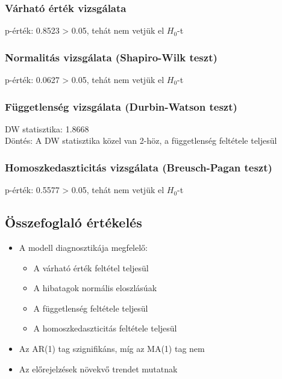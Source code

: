 \documentclass[11pt]{article}
\providecommand{\tightlist}{%
      \setlength{\itemsep}{0pt}\setlength{\parskip}{0pt}}
\begin{document}
\subsubsection{Várható érték
vizsgálata}\label{vuxe1rhatuxf3-uxe9rtuxe9k-vizsguxe1lata}

p-érték: 0.8523 \textgreater{} 0.05, tehát nem vetjük el $H_0$-t

\subsubsection{Normalitás vizsgálata (Shapiro-Wilk
teszt)}\label{normalituxe1s-vizsguxe1lata-shapiro-wilk-teszt}

p-érték: 0.0627 \textgreater{} 0.05, tehát nem vetjük el $H_0$-t

\subsubsection{Függetlenség vizsgálata (Durbin-Watson
teszt)}\label{fuxfcggetlensuxe9g-vizsguxe1lata-durbin-watson-teszt}

DW statisztika: 1.8668\\
Döntés: A DW statisztika közel van 2-höz, a függetlenség feltétele
teljesül

\subsubsection{Homoszkedaszticitás vizsgálata (Breusch-Pagan
teszt)}\label{homoszkedaszticituxe1s-vizsguxe1lata-breusch-pagan-teszt}

p-érték: 0.5577 \textgreater{} 0.05, tehát nem vetjük el $H_0$-t

\subsection{Összefoglaló
értékelés}\label{uxf6sszefoglaluxf3-uxe9rtuxe9keluxe9s}

\begin{itemize}
\tightlist
\item
  A modell diagnosztikája megfelelő:

  \begin{itemize}
  \tightlist
  \item
    A várható érték feltétel teljesül
  \item
    A hibatagok normális eloszlásúak
  \item
    A függetlenség feltétele teljesül
  \item
    A homoszkedaszticitás feltétele teljesül
  \end{itemize}
\item
  Az AR(1) tag szignifikáns, míg az MA(1) tag nem
\item
  Az előrejelzések növekvő trendet mutatnak
\end{itemize}


    
    
    
\end{document}
